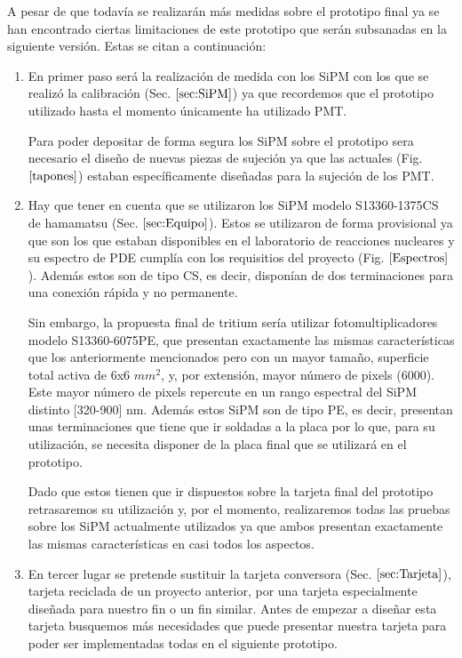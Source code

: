 A pesar de que todavía se realizarán más medidas sobre el prototipo final ya se han encontrado ciertas limitaciones de este prototipo que serán subsanadas  en la siguiente versión. Estas se citan a continuación:
\begin{enumerate}
\item{} En primer paso será la realización de medida con los SiPM con los que se realizó la calibración (Sec. $\ref{sec:SiPM}$) ya que recordemos que el prototipo utilizado hasta el momento únicamente ha utilizado PMT. 

Para poder depositar de forma segura los SiPM sobre el prototipo sera necesario el diseño de nuevas piezas de sujeción ya que las actuales (Fig. $\ref{tapones}$) estaban específicamente diseñadas para la sujeción de los PMT.

\item{} Hay que tener en cuenta que se utilizaron los SiPM modelo S13360-1375CS de hamamatsu (Sec. $\ref{sec:Equipo}$). Estos se utilizaron de forma provisional ya que son los que estaban disponibles en el laboratorio de reacciones nucleares y su espectro de PDE cumplía con los requisitios del proyecto (Fig. $\ref{Espectros}$). Además estos son de tipo CS, es decir, disponían de dos terminaciones para una conexión rápida y no permanente. 

Sin embargo, la propuesta final de tritium sería utilizar fotomultiplicadores modelo S13360-6075PE,  que presentan exactamente las mismas características que los anteriormente mencionados pero con un mayor tamaño, superficie total activa de 6x6 $mm^2$, y, por extensión, mayor número de pixels (6000). Este mayor número de pixels repercute en un rango espectral del SiPM distinto [320-900] nm. Además estos SiPM son de tipo PE, es decir, presentan unas terminaciones que tiene que ir soldadas a la placa por lo que, para su utilización, se necesita disponer de la placa final que se utilizará en el prototipo. 

Dado que estos tienen que ir dispuestos sobre la tarjeta final del prototipo retrasaremos su utilización y, por el momento, realizaremos todas las pruebas sobre los SiPM actualmente utilizados ya que ambos presentan exactamente las mismas características en casi todos los aspectos.

\item{} En tercer lugar se pretende sustituir la tarjeta conversora (Sec. $\ref{sec:Tarjeta}$), tarjeta reciclada de un proyecto anterior, por una tarjeta especialmente diseñada para nuestro fin o un fin similar. Antes de empezar a diseñar esta tarjeta busquemos más necesidades que puede presentar nuestra tarjeta para poder ser implementadas todas en el siguiente prototipo.


\end{enumerate}

